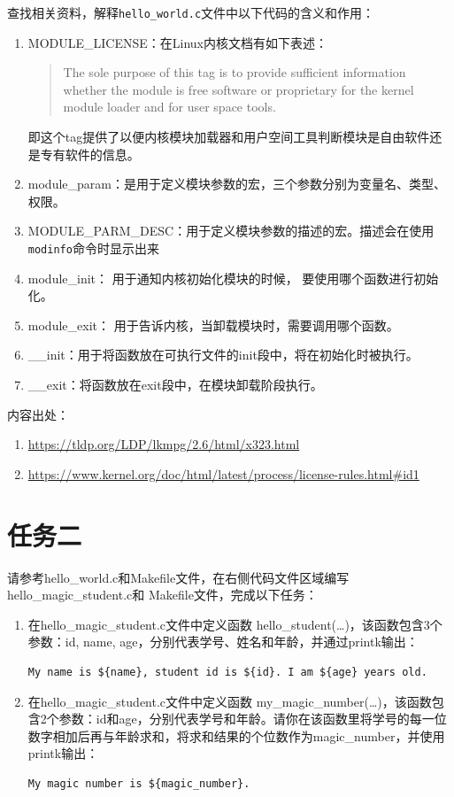 \documentclass[a4paper,twoside]{article}
\begin{document}
\begin{spacing}{1.2}
查找相关资料，解释\texttt{hello\_world.c}文件中以下代码的含义和作用：
\begin{enumerate}
	\item MODULE\_LICENSE：在Linux内核文档有如下表述：
	\begin{quotation}
		The sole purpose of this tag is to provide sufficient information whether the module is free software or proprietary for the kernel module loader and for user space tools.
	\end{quotation}
	即这个tag提供了以便内核模块加载器和用户空间工具判断模块是自由软件还是专有软件的信息。
	\item module\_param：是用于定义模块参数的宏，三个参数分别为变量名、类型、权限。
	\item MODULE\_PARM\_DESC：用于定义模块参数的描述的宏。描述会在使用\texttt{modinfo}命令时显示出来
	\item module\_init： 用于通知内核初始化模块的时候， 要使用哪个函数进行初始化。
	\item module\_exit： 用于告诉内核，当卸载模块时，需要调用哪个函数。
	\item \_\_init：用于将函数放在可执行文件的init段中，将在初始化时被执行。
	\item \_\_exit：将函数放在exit段中，在模块卸载阶段执行。
\end{enumerate}

内容出处：
\begin{enumerate}
	\item \url{https://tldp.org/LDP/lkmpg/2.6/html/x323.html}
	\item \url{https://www.kernel.org/doc/html/latest/process/license-rules.html#id1}
\end{enumerate}

\section{任务二}

请参考hello\_world.c和Makefile文件，在右侧代码文件区域编写hello\_magic\_student.c和 Makefile文件，完成以下任务：

\begin{enumerate}
	\item 在hello\_magic\_student.c文件中定义函数 hello\_student(…)，该函数包含3个参数：id, name, age，分别代表学号、姓名和年龄，并通过printk输出：
	\begin{verbatim}
My name is ${name}, student id is ${id}. I am ${age} years old.
	\end{verbatim}
	\item 在hello\_magic\_student.c文件中定义函数 my\_magic\_number(…)，该函数包含2个参数：id和age，分别代表学号和年龄。请你在该函数里将学号的每一位数字相加后再与年龄求和，将求和结果的个位数作为magic\_number，并使用printk输出：
	\begin{verbatim}
My magic number is ${magic_number}.
	\end{verbatim}
\end{enumerate}


\end{spacing}
\end{document}

